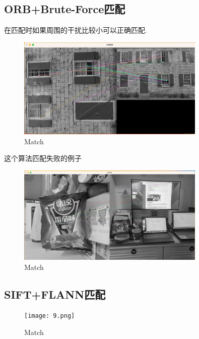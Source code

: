 \documentclass{article}
\begin{document}
\subsection*{ORB+Brute-Force匹配}

在匹配时如果周围的干扰比较小可以正确匹配.
\begin{figure}[H]
    \centering
    \includegraphics[width=0.8\textwidth]{8.png}
    \caption{\label{pr2}Match}
    \end{figure}

这个算法匹配失败的例子
\begin{figure}[H]
    \centering
    \includegraphics[width=0.8\textwidth]{7.png}
    \caption{\label{pr2}Match}
    \end{figure}


\subsection*{SIFT+FLANN匹配}
\begin{figure}[H]
    \centering
    \texttt{[image: 9.png]}
    \caption{\label{pr2}Match}
    \end{figure}
\end{document}
